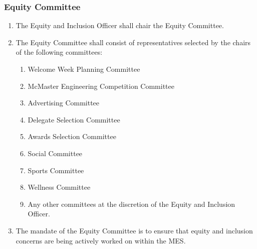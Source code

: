 \subsubsection{Equity Committee}
\label{equity-committee}
\begin{enumerate}
 \item
  The Equity and Inclusion Officer shall chair the Equity Committee.
 \item
  The Equity Committee shall consist of representatives selected by the chairs of the following committees:

  \begin{enumerate}
   \item
    Welcome Week Planning Committee
   \item
    McMaster Engineering Competition Committee
   \item
    Advertising Committee
   \item
    Delegate Selection Committee
   \item
    Awards Selection Committee
   \item
    Social Committee
   \item
    Sports Committee
   \item
    Wellness Committee
   \item
    Any other committees at the discretion of the Equity and Inclusion Officer.
  \end{enumerate}
 \item
  The mandate of the Equity Committee is to ensure that equity and inclusion concerns are being actively worked on within the MES.

\end{enumerate}

